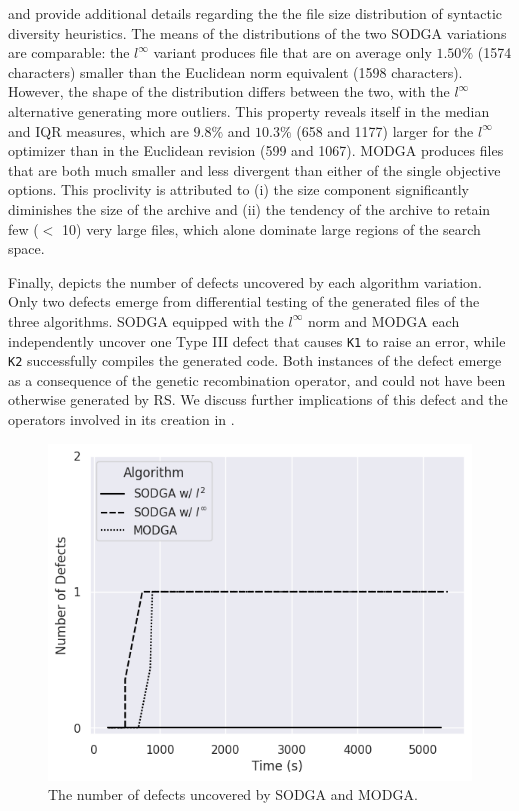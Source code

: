  and  provide additional
details regarding the the file size distribution of syntactic diversity heuristics.
The means of the distributions of the two \gls{SODGA} variations
are comparable: the $l^\infty$ variant produces file that are on average only
$1.50\%$ (1574 characters) smaller than the Euclidean norm equivalent (1598 characters).
However, the shape of the distribution differs between the two, with the $l^\infty$ alternative
generating more outliers.
This property reveals itself in the median and \gls{IQR} measures,
which are $9.8\%$ and $10.3\%$ (658 and 1177) larger for 
the $l^\infty$ optimizer than in the Euclidean revision (599 and 1067).
\gls{MODGA} produces files that are both much smaller and less divergent than either
of the single objective options.
This proclivity is attributed to (i) the size component
significantly diminishes the size of the archive and (ii)
the tendency of the archive to retain few ($<$ 10) very large files, which
alone dominate large regions of the search space.

Finally,  depicts the number of defects uncovered
by each algorithm variation.
Only two defects emerge from differential testing
of the generated files of the three algorithms.
\gls{SODGA} equipped with the $l^\infty$ norm and \gls{MODGA}
each independently uncover one Type III defect that causes
\texttt{K1} to raise an error, while \texttt{K2} successfully
compiles the generated code.
Both instances of the defect emerge as a consequence of the genetic
recombination operator, and could not have been otherwise generated
by \gls{RS}.
We discuss further implications of this defect
and the operators involved in its creation in .

\begin{figure}
    \centering
    \includegraphics[scale=0.6]{img/rq1-2/rq1-2convergence.png}
    \caption{The number of defects uncovered by \gls{SODGA} and \gls{MODGA}.}
    \label{fig:rq1-2convergence}
\end{figure}

